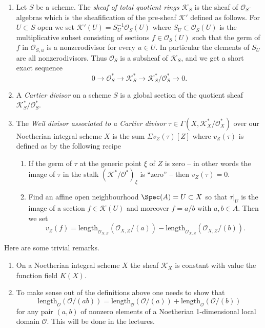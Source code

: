 \begin{definition}
\begin{enumerate}
\begin{enumerate}
\end{enumerate}
\item Let $S$ be a scheme. The {\it sheaf of total quotient
rings ${\mathcal K}_S$} is the sheaf of ${\mathcal O}_S$-algebras which is
the sheafification of the pre-sheaf ${\mathcal K}'$ defined as follows.
For $U \subset S$ open we set ${\mathcal K}'(U) = S_U^{-1}{\mathcal O}_S(U)$
where $S_U \subset {\mathcal O}_S(U)$ is the multiplicative subset
consisting of sections $f \in {\mathcal O}_S(U)$ such that the germ
of $f$ in ${\mathcal O}_{S, u}$ is a nonzerodivisor for every $u\in U$.
In particular the elements of $S_U$ are all nonzerodivisors.
Thus ${\mathcal O}_S$ is a subsheaf of ${\mathcal K}_S$, and we get a
short exact sequence
$$
0 \to {\mathcal O}_S^\ast \to {\mathcal K}_S^\ast \to
{\mathcal K}_S^\ast/{\mathcal O}_S^\ast \to 0.
$$
\item A {\it Cartier divisor} on a scheme $S$ is a global
section of the quotient sheaf ${\mathcal K}_S^\ast/{\mathcal O}_S^\ast$.
\item The {\it Weil divisor associated to a Cartier divisor}
$\tau \in \Gamma(X, {\mathcal K}_X^\ast/{\mathcal O}_X^\ast)$ over our
Noetherian integral scheme
$X$ is the sum $\Sigma v_Z(\tau)[Z]$ where $v_Z(\tau)$ is defined
as by the following recipe
\begin{enumerate}
\item If the germ of $\tau$ at the generic point $\xi$
of $Z$ is zero -- in other words the image of $\tau$ in the stalk
$({\mathcal K}^\ast/{\mathcal O}^\ast)_\xi$ is ``zero'' -- then $v_Z(\tau) = 0$.
\item Find an affine open neighbourhood $\Spec(A) = U \subset X$
so that $\tau|_U$ is the image of a section $f \in {\mathcal K}(U)$
and moreover $f = a/b$ with $a, b \in A$. Then we set
$$
v_Z(f) = \text{length}_{{\mathcal O}_{X, Z}}({\mathcal O}_{X, Z}/(a)) -
\text{length}_{{\mathcal O}_{X, Z}}({\mathcal O}_{X, Z}/(b)).
$$
\end{enumerate}
\end{enumerate}
\end{definition}

\begin{remarks}
\label{remarks-divisors}
Here are some trivial remarks.
\begin{enumerate}
\item On a Noetherian integral scheme $X$ the
sheaf ${\mathcal K}_X$ is constant with value the function field $K(X)$.
\item To make sense out of the definitions above one needs
to show that
$$
\text{length}_{\mathcal O}({\mathcal O}/(ab)) =
\text{length}_{\mathcal O}({\mathcal O}/(a)) +
\text{length}_{\mathcal O}({\mathcal O}/(b))
$$
for any pair $(a, b)$ of nonzero elements of a Noetherian 1-dimensional
local domain ${\mathcal O}$. This will be done in the lectures.
\end{enumerate}
\end{remarks}

